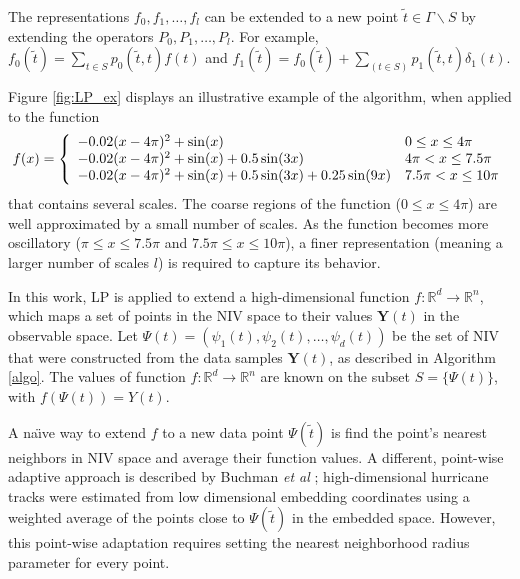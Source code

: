 \documentclass[aip,jcp,preprint]{revtex4-1}
\begin{document}
The representations $f_0, f_1, \dots, f_l$ can be extended to a new point $\tilde{t} \in \Gamma \backslash S $ by extending the operators $P_0, P_1,\ldots,P_l$.
%
For example, $f_0(\tilde{t}) = \sum_{t \in S} p_0(\tilde{t}, t)f(t)$ and
$f_1(\tilde{t}) = f_0(\tilde{t}) + \sum_{(t \in S)}p_1(\tilde{t}, t)\delta_1(t)$.

\begin{widetext}
Figure \ref{fig:LP_ex} displays an illustrative example of the algorithm, when applied to the function
 \begin{equation} \label{eq:LP_example}
f(x) = \left\{
\begin{array}{l l}
-0.02(x-4\pi)^2 + \sin(x) &  0 \le x \le 4\pi \\
-0.02(x-4\pi)^2 + \sin(x) + 0.5 \sin(3x) &  4\pi < x \le 7.5 \pi \\
-0.02(x-4\pi)^2 + \sin(x) + 0.5 \sin(3x) +0.25 \sin(9x) &  7.5 \pi < x \le 10 \pi
\end{array}
\right.
\end{equation}
that contains several scales.
%
The coarse regions of the function ($0 \le x \le 4\pi$) are well approximated by a small number of scales.
%
As the function becomes more oscillatory ($\pi \le x \le 7.5\pi$ and $7.5\pi \le x \le 10\pi$),
a finer representation (meaning a larger number of scales  $l$) is required to capture its behavior.
\end{widetext}

In this work, LP is applied to extend a high-dimensional function $f:\mathbb{R}^d \rightarrow \mathbb{R}^n$, which maps a set of points in the NIV space to their values $\mathbf{Y}(t)$ in the observable space.
%
Let $\Psi(t) = \left(\psi_1(t),\psi_2(t),\ldots,\psi_d(t)\right)$ be the set of NIV that were constructed from the data samples $\mathbf{Y}(t)$, as described in Algorithm \ref{algo}.
%
The values of function $f:\mathbb{R}^d \rightarrow \mathbb{R}^n$ are known on the subset $S = \{\Psi(t)\}$, with $f(\Psi(t)) = Y(t)$.

A na\"{\i}ve way to extend $f$ to a new data point $\Psi(\tilde{t})$ is find the point's nearest neighbors in NIV space and average their function values.
%
A different, point-wise adaptive approach is described by Buchman {\em et al} \cite{buchman2011high};
high-dimensional hurricane tracks were estimated from low dimensional embedding coordinates using a weighted average of the points close to $\Psi(\tilde{t})$ in the embedded space.
%
However, this point-wise adaptation requires setting the nearest neighborhood radius parameter for every point.
\end{document}

